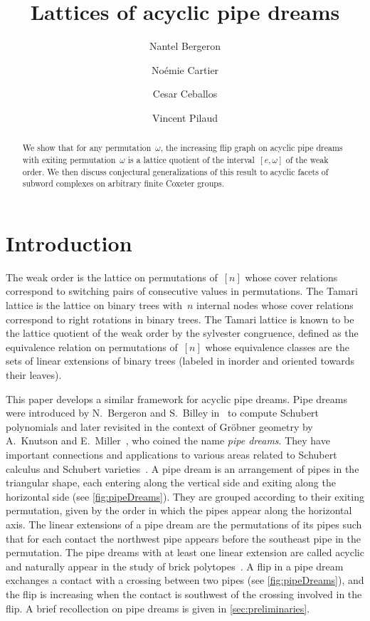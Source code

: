 \documentclass[reqno]{amsart}
\title{Lattices of acyclic pipe dreams}
\author[N.~Bergeron]{Nantel Bergeron}
\author[N.~Cartier]{No\'emie Cartier}
\author[C.~Ceballos]{Cesar Ceballos}
\author[V.~Pilaud]{Vincent Pilaud}
\theoremstyle{definition}
\begin{document}
\begin{abstract}
We show that for any permutation~$\omega$, the increasing flip graph on acyclic pipe dreams with exiting permutation~$\omega$ is a lattice quotient of the interval~$[e,\omega]$ of the weak order.
We then discuss conjectural generalizations of this result to acyclic facets of subword complexes on arbitrary finite Coxeter groups.
\end{abstract}

\maketitle

\tableofcontents


\section{Introduction}
\label{sec:introduction}

The weak order is the lattice on permutations of~$[n]$ whose cover relations correspond to switching pairs of consecutive values in permutations.
The Tamari lattice is the lattice on binary trees with~$n$ internal nodes whose cover relations correspond to right rotations in binary trees.
The Tamari lattice is known to be the lattice quotient of the weak order by the sylvester congruence, defined as the equivalence relation on permutations of~$[n]$ whose equivalence classes are the sets of linear extensions of binary trees (labeled in inorder and oriented towards their leaves).

This paper develops a similar framework for acyclic pipe dreams.
Pipe dreams were introduced by N.~Bergeron and S.~Billey in~\cite{BergeronBilley} to compute Schubert polynomials and later revisited in the context of Gr\"obner geometry by A.~Knutson and E.~Miller~\cite{KnutsonMiller-GroebnerGeometry}, who coined the name \emph{pipe dreams}.
They have important connections and applications to various areas related to Schubert calculus and Schubert varieties~\cite{LascouxSchutzenberger-PolynomesSchubert, LascouxSchutzenberger-SchubertLittlewoudRichardson}. 
A pipe dream is an arrangement of pipes in the triangular shape, each entering along the vertical side and exiting along the horizontal side (see \cref{fig:pipeDreams}).
They are grouped according to their exiting permutation, given by the order in which the pipes appear along the horizontal axis.
The linear extensions of a pipe dream are the permutations of its pipes such that for each contact the northwest pipe appears before the southeast pipe in the permutation.
The pipe dreams with at least one linear extension are called acyclic and naturally appear in the study of brick polytopes~\cite{PilaudSantos-brickPolytope}.
A flip in a pipe dream exchanges a contact with a crossing between two pipes (see \cref{fig:pipeDreams}), and the flip is increasing when the contact is southwest of the crossing involved in the flip.
A brief recollection on pipe dreams is given in \cref{sec:preliminaries}.
\end{document}
